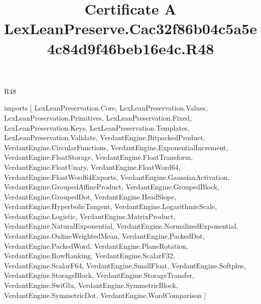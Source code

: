 \begin{lexlean}{R48}
\title{Certificate A LexLeanPreserve.Cac32f86b04c5a5e4c84d9f46beb16e4c.R48}
\begin{coremodule}
imports [
  LexLeanPreservation.Core,
  LexLeanPreservation.Values,
  LexLeanPreservation.Primitives,
  LexLeanPreservation.Fixed,
  LexLeanPreservation.Keys,
  LexLeanPreservation.Templates,
  LexLeanPreservation.Validate,
  VerdantEngine.BitpackedProduct,
  VerdantEngine.CircularFunctions,
  VerdantEngine.ExponentialIncrement,
  VerdantEngine.FloatStorage,
  VerdantEngine.FloatTransform,
  VerdantEngine.FloatUnary,
  VerdantEngine.FloatWord64,
  VerdantEngine.FloatWord64Exports,
  VerdantEngine.GaussianActivation,
  VerdantEngine.GroupedAffineProduct,
  VerdantEngine.GroupedBlock,
  VerdantEngine.GroupedDot,
  VerdantEngine.HeadSlope,
  VerdantEngine.HyperbolicTangent,
  VerdantEngine.LogarithmicScale,
  VerdantEngine.Logistic,
  VerdantEngine.MatrixProduct,
  VerdantEngine.NaturalExponential,
  VerdantEngine.NormalizedExponential,
  VerdantEngine.OnlineWeightedMean,
  VerdantEngine.PackedDot,
  VerdantEngine.PackedWord,
  VerdantEngine.PlaneRotation,
  VerdantEngine.RowRanking,
  VerdantEngine.ScalarF32,
  VerdantEngine.ScalarF64,
  VerdantEngine.SmallFloat,
  VerdantEngine.Softplus,
  VerdantEngine.StorageBlock,
  VerdantEngine.StorageTransfer,
  VerdantEngine.SwiGlu,
  VerdantEngine.SymmetricBlock,
  VerdantEngine.SymmetricDot,
  VerdantEngine.WordComparison
]


\end{coremodule}
\end{lexlean}
